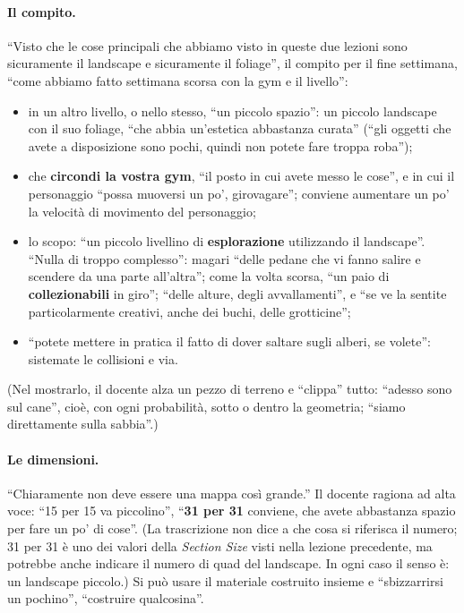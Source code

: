 \paragraph{Il compito.} ``Visto che le cose principali che abbiamo visto in queste due lezioni
sono sicuramente il landscape e sicuramente il foliage'', il compito per il fine settimana,
``come abbiamo fatto settimana scorsa con la gym e il livello'':
\begin{itemize}
  \item in un altro livello, o nello stesso, ``un piccolo spazio'': un piccolo landscape con
        il suo foliage, ``che abbia un'estetica abbastanza curata'' (``gli oggetti che avete a
        disposizione sono pochi, quindi non potete fare troppa roba'');
  \item che \textbf{circondi la vostra gym}, ``il posto in cui avete messo le cose'', e in cui
        il personaggio ``possa muoversi un po', girovagare''; conviene aumentare un po' la
        velocità di movimento del personaggio;
  \item lo scopo: ``un piccolo livellino di \textbf{esplorazione} utilizzando il landscape''.
        ``Nulla di troppo complesso'': magari ``delle pedane che vi fanno salire e scendere da
        una parte all'altra''; come la volta scorsa, ``un paio di \textbf{collezionabili} in
        giro''; ``delle alture, degli avvallamenti'', e ``se ve la sentite particolarmente
        creativi, anche dei buchi, delle grotticine'';
  \item ``potete mettere in pratica il fatto di dover saltare sugli alberi, se volete'':
        sistemate le collisioni e via.
\end{itemize}
(Nel mostrarlo, il docente alza un pezzo di terreno e ``clippa'' tutto: ``adesso sono sul
cane'', cioè, con ogni probabilità, sotto o dentro la geometria; ``siamo direttamente sulla
sabbia''.)

\paragraph{Le dimensioni.} ``Chiaramente non deve essere una mappa così grande.'' Il docente
ragiona ad alta voce: ``15 per 15 va piccolino'', ``\textbf{31 per 31} conviene, che avete
abbastanza spazio per fare un po' di cose''. (La trascrizione non dice a che cosa si
riferisca il numero; 31 per 31 è uno dei valori della \emph{Section Size} visti nella lezione
precedente, ma potrebbe anche indicare il numero di quad del landscape. In ogni caso il
senso è: un landscape piccolo.) Si può usare il materiale costruito insieme e ``sbizzarrirsi
un pochino'', ``costruire qualcosina''.

